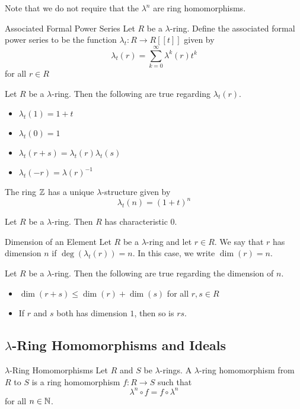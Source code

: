 \documentclass[a4paper]{article}
\begin{document}
Note that we do not require that the $\lambda^n$ are ring homomorphisms. 

\begin{defn}{Associated Formal Power Series}{} Let $R$ be a $\lambda$-ring. Define the associated formal power series to be the function $\lambda_t:R\to R[[t]]$ given by $$\lambda_t(r)=\sum_{k=0}^\infty\lambda^k(r)t^k$$ for all $r\in R$
\end{defn}

\begin{prp}{}{} Let $R$ be a $\lambda$-ring. Then the following are true regarding $\lambda_t(r)$. 
\begin{itemize}
\item $\lambda_t(1)=1+t$
\item $\lambda_t(0)=1$
\item $\lambda_t(r+s)=\lambda_t(r)\lambda_t(s)$
\item $\lambda_t(-r)=\lambda(r)^{-1}$
\end{itemize}
\end{prp}

\begin{prp}{}{} The ring $\mathbb{Z}$ has a unique $\lambda$-structure given by $$\lambda_t(n)=(1+t)^n$$
\end{prp}

\begin{prp}{}{} Let $R$ be a $\lambda$-ring. Then $R$ has characteristic $0$. 
\end{prp}

\begin{defn}{Dimension of an Element}{} Let $R$ be a $\lambda$-ring and let $r\in R$. We say that $r$ has dimension $n$ if $\deg(\lambda_t(r))=n$. In this case, we write $\dim(r)=n$. 
\end{defn}

\begin{prp}{}{} Let $R$ be a $\lambda$-ring. Then the following are true regarding the dimension of $n$. 
\begin{itemize}
\item $\dim(r+s)\leq\dim(r)+\dim(s)$ for all $r,s\in R$
\item If $r$ and $s$ both has dimension $1$, then so is $rs$. 
\end{itemize}
\end{prp}

\subsection{$\lambda$-Ring Homomorphisms and Ideals}
\begin{defn}{$\lambda$-Ring Homomorphisms}{} Let $R$ and $S$ be $\lambda$-rings. A $\lambda$-ring homomorphism from $R$ to $S$ is a ring homomorphism $f:R\to S$ such that $$\lambda^n\circ f=f\circ\lambda^n$$ for all $n\in\mathbb{N}$. 
\end{defn}
\end{document}
